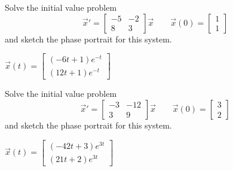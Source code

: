 \begin{exercise}
Solve the initial value problem
\[ {\vec{x}}' = \begin{bmatrix} -5 & -2 \\ 8 & 3 \end{bmatrix} \vec{x} \qquad \vec{x}(0) = \begin{bmatrix} 1 \\ 1 \end{bmatrix} \] and sketch the phase portrait for this system.
\end{exercise}
\comboSol{%
}
{%
$\vec{x}(t) = \left[\begin{smallmatrix} (-6t+1)e^{-t} \\ (12t+1)e^{-t} \end{smallmatrix}\right]$ \hfill{}\hfill\hfill
}

\begin{exercise}
Solve the initial value problem
\[ {\vec{x}}' = \begin{bmatrix} -3 & -12 \\ 3 & 9 \end{bmatrix}\vec{x} \qquad \vec{x}(0) = \begin{bmatrix} 3 \\ 2  \end{bmatrix} \] and sketch the phase portrait for this system.
\end{exercise}
\comboSol{%
}
{%
$\vec{x}(t) = \left[\begin{smallmatrix} (-42t+3)e^{3t} \\ (21t + 2)e^{3t} \end{smallmatrix}\right]$ \hfill{}\hfill\hfill
}

